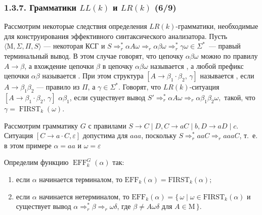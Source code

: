 \begin{frame}
\frametitle{1.3.7. Грамматики $LL(k)$ и $LR(k)$ (6/9)}
Рассмотрим некоторые следствия определения 
$LR(k)$-грамматики, необходимые для конструирования
эффективного синтаксического анализатора.
Пусть $\langle \mathrm{M}, \Sigma, \Pi, S \rangle$ --- некоторая КСГ и
$S\Rightarrow^*_r \alpha A \omega \Rightarrow_r \alpha \beta \omega
\Rightarrow_r^*\gamma\omega \in \Sigma^*$~---
правый терминальный вывод.
В этом случае говорят, что цепочку $\alpha \beta \omega$ 
можно  по правилу
$A\to\beta$, а вхождение цепочки $\beta$ в цепочку 
$\alpha \beta \omega$ называется ,
а любой префикс цепочки $\alpha\beta$ называется 
.
При этом структура
\(
[A \to \beta_1 \cdot \beta_2,\, \gamma]
\)
называется ,  
если $A \to \beta_1 \beta_2$ --- правило из $\Pi$, 
а $\gamma \in \Sigma^{*}$. 
Говорят, что $LR(k)$-ситуация $[A \to \beta_1 \cdot \beta_2,\, \gamma]$ 
 $\alpha \beta_1$, если существует вывод
\(
S' \Rightarrow_r^* \alpha A \omega \Rightarrow_r \alpha \beta_1 \beta_2 \omega,
\)
такой, что $\gamma = \operatorname{FIRST}_k(\omega)$.    
\begin{example}
    Рассмотрим грамматику \(G\) с правилами 
    \(S \to C \mid D, C \to aC \mid b, D \to aD\mid c\). 
    Ситуация \([C \to a \cdot C, \varepsilon]\) допустима для \(aaa\), 
    поскольку \(S \Rightarrow_r^* aaC \Rightarrow_r aaaC\), 
    т.~е. в этом примере 
    \(\alpha = aa\) и \(\omega = \varepsilon\)
\end{example} 

\smallskip
Определим функцию $\operatorname{EFF}_k^G(\alpha)$ так:
\begin{enumerate}
    \item если $\alpha$ начинается терминалом, то
    \(
        \mathrm{EFF}_k(\alpha) = \mathrm{FIRST}_k(\alpha);
    \)
    \item если $\alpha$ начинается нетерминалом, то
    \(
        \mathrm{EFF}_k(\alpha) = 
        \{\, \omega \mid 
        \omega \in \mathrm{FIRST}_k(\alpha)\) 
         и существует вывод 
        $\alpha \Rightarrow_r^* \beta \Rightarrow_r \omega \delta$,
        где  $\beta \neq A \omega \delta$  для $ A \in \mathrm{M} \,\}$.
\end{enumerate}

\end{frame}

